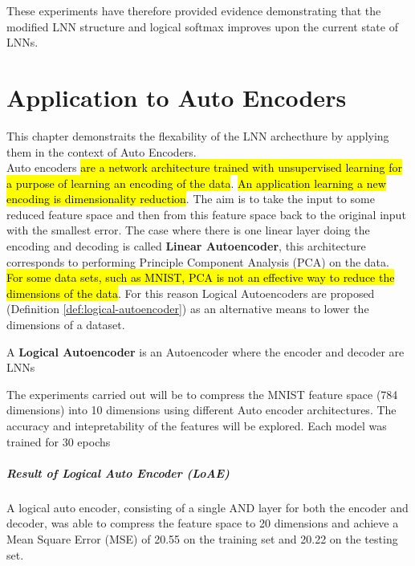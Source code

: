 These experiments have therefore provided evidence demonstrating that the modified LNN structure and logical softmax improves upon the current state of LNNs.  

\chapter{Application to Auto Encoders} \label{C:lnn-application}
This chapter demonstraits the flexability of the LNN archecthure by applying them in the context of Auto Encoders. \\

Auto encoders \cite{baldi2012complex} \hl{are a network architecture trained with unsupervised learning for a purpose of learning an encoding of the data}. \hl{An application learning a new encoding is dimensionality reduction}. The aim is to take the input to some reduced feature space and then from this feature space back to the original input with the smallest error. The case where there is one linear layer doing the encoding and decoding is called \textbf{Linear Autoencoder}, this architecture corresponds to performing Principle Component Analysis (PCA) on the data.\\

\hl{For some data sets, such as MNIST, PCA is not an effective way to reduce the dimensions of the data}. For this reason Logical Autoencoders are proposed (Definition \ref{def:logical-autoencoder}) as an alternative means to lower the dimensions of a dataset.

\begin{definition} \label{def:logical-autoencoder}
	A \textbf{Logical Autoencoder} is an Autoencoder where the encoder and decoder are LNNs
\end{definition}

The experiments carried out will be to compress the MNIST feature space (784 dimensions) into 10 dimensions using different Auto encoder architectures. The accuracy and intepretability of the features will be explored. Each model was trained for 30 epochs

\paragraph{Result of Logical Auto Encoder (LoAE)}
A logical auto encoder, consisting of a single AND layer for both the encoder and decoder, was able to compress the feature space to 20 dimensions and achieve a Mean Square Error (MSE) of 20.55 on the training set and 20.22 on the testing set.

